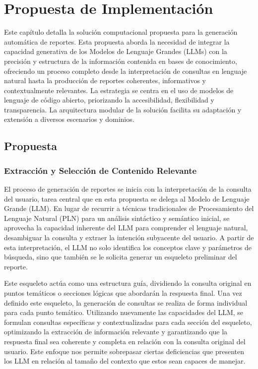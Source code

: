 \chapter{Propuesta de Implementación}\label{chapter:proposal}

Este capítulo detalla la solución computacional propuesta para la generación automática de reportes. Esta propuesta aborda la necesidad de integrar la capacidad generativa de los Modelos de Lenguaje Grandes (LLMs) con la precisión y estructura de la información contenida en bases de conocimiento, ofreciendo un proceso completo desde la interpretación de consultas en lenguaje natural hasta la producción de reportes coherentes, informativos y contextualmente relevantes. La estrategia se centra en el uso de modelos de lenguaje de código abierto, priorizando la accesibilidad, flexibilidad y transparencia. La arquitectura modular de la solución facilita su adaptación y extensión a diversos escenarios y dominios.

\section{Propuesta}

\subsection{Extracción y Selección de Contenido Relevante}

El proceso de generación de reportes se inicia con la interpretación de la consulta del usuario, tarea central que en esta propuesta se delega al Modelo de Lenguaje Grande (LLM). En lugar de recurrir a técnicas tradicionales de Procesamiento del Lenguaje Natural (PLN) para un análisis sintáctico y semántico inicial, se aprovecha la capacidad inherente del LLM para comprender el lenguaje natural, desambiguar la consulta y extraer la intención subyacente del usuario. A partir de esta interpretación, el LLM no solo identifica los conceptos clave y parámetros de búsqueda, sino que también se le solicita generar un esqueleto preliminar del reporte.

Este esqueleto actúa como una estructura guía, dividiendo la consulta original en puntos temáticos o secciones lógicas que abordarán la respuesta final. Una vez definido este esqueleto, la generación de consultas se realiza de forma individual para cada punto temático. Utilizando nuevamente las capacidades del LLM, se formulan consultas específicas y contextualizadas para cada sección del esqueleto, optimizando la extracción de información relevante y garantizando que la respuesta final sea coherente y completa en relación con la consulta original del usuario. Este enfoque nos permite sobrepasar ciertas deficiencias que presenten los LLM en relación al tamaño del contexto que estos sean capaces de manejar.

